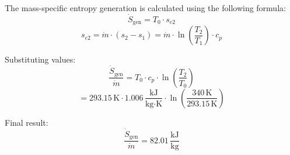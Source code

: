 The mass-specific entropy generation is calculated using the following formula:  
\[
\dot{S}_{\text{gen}} = T_0 \cdot s_{e2}
\]  
\[
s_{e2} = \dot{m} \cdot (s_2 - s_1) = \dot{m} \cdot \ln \left( \frac{T_2}{T_1} \right) \cdot c_p
\]  

Substituting values:  
\[
\frac{\dot{S}_{\text{gen}}}{\dot{m}} = T_0 \cdot c_p \cdot \ln \left( \frac{T_2}{T_0} \right)
\]  
\[
= 293.15 \, \text{K} \cdot 1.006 \, \frac{\text{kJ}}{\text{kg·K}} \cdot \ln \left( \frac{340 \, \text{K}}{293.15 \, \text{K}} \right)
\]  

Final result:  
\[
\frac{\dot{S}_{\text{gen}}}{\dot{m}} = 82.01 \, \frac{\text{kJ}}{\text{kg}}
\]